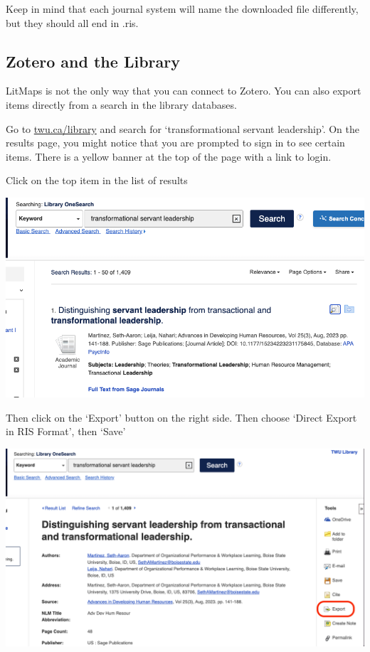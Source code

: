 \documentclass[
]{book}
\theoremstyle{definition}
\theoremstyle{definition}
\theoremstyle{definition}
\theoremstyle{definition}
\theoremstyle{remark}
\begin{document}
Keep in mind that each journal system will name the downloaded file differently, but they should all end in .ris.

\hypertarget{zotero-and-the-library}{%
\subsection*{Zotero and the Library}\label{zotero-and-the-library}}

LitMaps is not the only way that you can connect to Zotero. You can also export items directly from a search in the library databases.

Go to \href{https://twu.ca/library}{twu.ca/library} and search for `transformational servant leadership'. On the results page, you might notice that you are prompted to sign in to see certain items. There is a yellow banner at the top of the page with a link to login.

Click on the top item in the list of results

\includegraphics{assets/u2/library1.png}

Then click on the `Export' button on the right side. Then choose `Direct Export in RIS Format', then `Save'

\includegraphics{assets/u2/library2.png}
\end{document}
